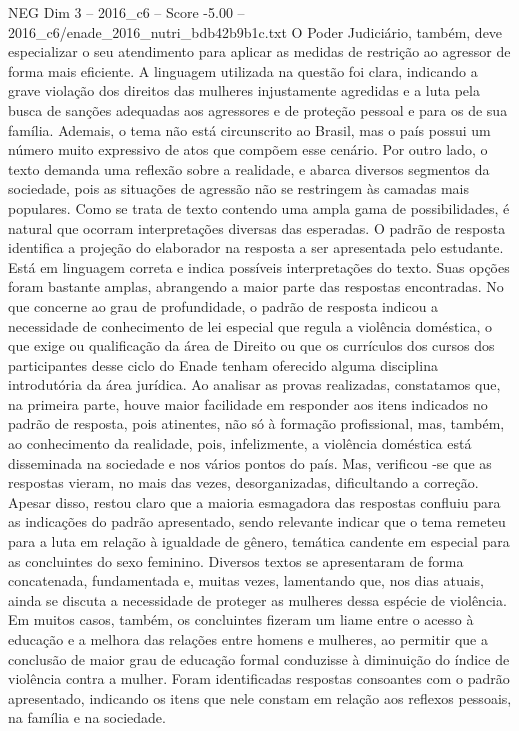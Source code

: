 \begin{textsample}{NEG Dim 3 – 2016\_c6 – Score -5.00 – 2016\_c6/enade\_2016\_nutri\_bdb42b9b1c.txt}
O Poder Judiciário, também, deve especializar o seu atendimento para aplicar as medidas de restrição ao agressor de forma mais eficiente.
A linguagem utilizada na questão foi clara, indicando a grave violação dos direitos das mulheres injustamente agredidas e a luta pela busca de sanções adequadas aos agressores e de proteção pessoal e para os de sua família.
Ademais, o tema não está circunscrito ao Brasil, mas o país possui um número muito expressivo de atos que compõem esse cenário.
Por outro lado, o texto demanda uma reflexão sobre a realidade, e abarca diversos segmentos da sociedade, pois as situações de agressão não se restringem às camadas mais populares.
Como se trata de texto contendo uma ampla gama de possibilidades, é natural que ocorram interpretações diversas das esperadas.
O padrão de resposta identifica a projeção do elaborador na resposta a ser apresentada pelo estudante.
Está em linguagem correta e indica possíveis interpretações do texto.
Suas opções foram bastante amplas, abrangendo a maior parte das respostas encontradas.
No que concerne ao grau de profundidade, o padrão de resposta indicou a necessidade de conhecimento de lei especial que regula a violência doméstica, o que exige ou qualificação da área de Direito ou que os currículos dos cursos dos participantes desse ciclo do Enade tenham oferecido alguma disciplina introdutória da área jurídica.
Ao analisar as provas realizadas, constatamos que, na primeira parte, houve maior facilidade em responder aos itens indicados no padrão de resposta, pois atinentes, não só à formação profissional, mas, também, ao conhecimento da realidade, pois, infelizmente, a violência doméstica está disseminada na sociedade e nos vários pontos do país.
Mas, verificou -se que as respostas vieram, no mais das vezes, desorganizadas, dificultando a correção.
Apesar disso, restou claro que a maioria esmagadora das respostas confluiu para as indicações do padrão apresentado, sendo relevante indicar que o tema remeteu para a luta em relação à igualdade de gênero, temática candente em especial para as concluintes do sexo feminino.
Diversos textos se apresentaram de forma concatenada, fundamentada e, muitas vezes, lamentando que, nos dias atuais, ainda se discuta a necessidade de proteger as mulheres dessa espécie de violência.
Em muitos casos, também, os concluintes fizeram um liame entre o acesso à educação e a melhora das relações entre homens e mulheres, ao permitir que a conclusão de maior grau de educação formal conduzisse à diminuição do índice de violência contra a mulher.
Foram identificadas respostas consoantes com o padrão apresentado, indicando os itens que nele constam em relação aos reflexos pessoais, na família e na sociedade.

\end{textsample}
